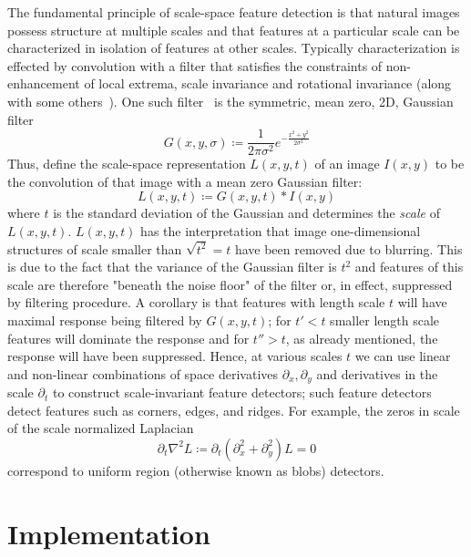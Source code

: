\documentclass[sigconf,nonacm]{acmart}
\begin{document}
The fundamental principle of scale-space feature detection is that natural images possess structure at multiple scales and that features at a particular scale can be characterized in isolation of features at other scales.
Typically characterization is effected by convolution with a filter that satisfies the constraints of non-enhancement of local extrema, scale invariance and rotational invariance (along with some others~\cite{}).
One such filter~\cite{} is the symmetric, mean zero, 2D, Gaussian filter
$$
    G(x,y,\sigma) \coloneqq \frac{1}{2\pi \sigma^2} e^{-\frac{x^2 +y ^2}{2\sigma^2}}
$$
Thus, define the scale-space representation $L(x,y, t)$ of an image $I(x,y)$ to be the convolution of that image with a mean zero Gaussian filter:
$$
    L(x,y,t) \coloneqq G(x,y,t) * I(x,y)
$$
where $t$ is the standard deviation of the Gaussian and determines the \textit{scale} of $L(x,y,t)$.
$L(x,y,t)$ has the interpretation that image one-dimensional structures of scale smaller than $\sqrt{t^2} = t$ have been removed due to blurring.
This is due to the fact that the variance of the Gaussian filter is $t^2$ and features of this scale are therefore "beneath the noise floor" of the filter or, in effect, suppressed by filtering procedure.
A corollary is that features with length scale $t$ will have maximal response being filtered by $G(x,y,t)$; for $t' < t$ smaller length scale features will dominate the response and for $t'' > t$, as already mentioned, the response will have been suppressed.
Hence, at various scales $t$ we can use linear and non-linear combinations of space derivatives $\partial_x, \partial_y$ and derivatives in the scale $\partial_t$ to construct scale-invariant feature detectors; such feature detectors detect features such as corners, edges, and ridges.
For example, the zeros in scale of the scale normalized Laplacian
\begin{equation}
    \partial_t \nabla^2 L \coloneqq \partial_t \left( \partial_x^2 + \partial _y^2\right) L = 0
    \label{eqn:blobdetector}
\end{equation}
correspond to uniform region (otherwise known as blobs) detectors.

\section{Implementation}\label{sec:implementation}
\end{document}
